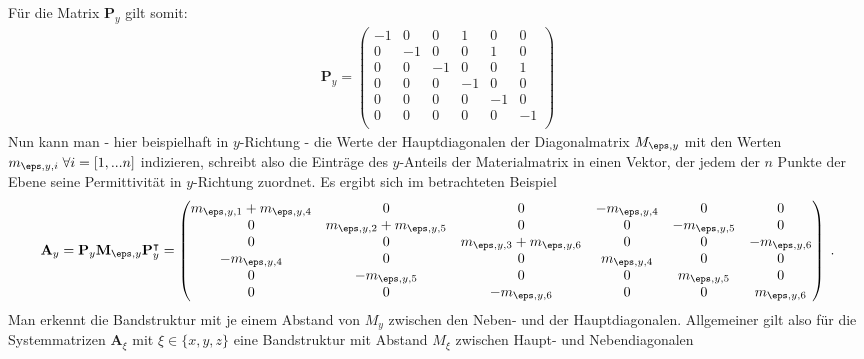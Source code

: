 \documentclass[./Protokollheft.tex]{subfiles}
\begin{document}
Für die Matrix $\mathbf{P}_y$ gilt somit:
\begin{align}
\mathbf{P}_y =  
\begin{pmatrix} 
   -1	& 0 	& 0	& 1		& 0 	& 0		\\
	0  	& -1	& 0	& 0		& 1		& 0		\\
   	0	& 0		&-1	& 0		& 0		& 1		\\ 
    0	& 0		& 0	& -1	& 0		& 0		\\ 
	0	& 0		& 0	& 0		& -1 	& 0		\\
	0	& 0		& 0	& 0		& 0 	& -1	\\
\end{pmatrix} 
\end{align}
Nun kann man - hier beispielhaft in $y$-Richtung - die Werte der Hauptdiagonalen der Diagonalmatrix $M_{\eps , y}$ mit den Werten $m_{\eps, y, i} \; \forall i = [1, ... n]$ indizieren, schreibt also die Einträge des $y$-Anteils der Materialmatrix in einen Vektor, der jedem der $n$ Punkte der Ebene seine Permittivität in $y$-Richtung zuordnet. Es ergibt sich im betrachteten Beispiel
\begin{align}
\mathbf{A}_y =  \mathbf{P}_y \mathbf{M}_{\eps,y} \mathbf{P}_y^\intercal = 
\begin{pmatrix} 
    m_{\eps, y, 1}+m_{\eps, y, 4}	& 0 	 				& 0						& -m_{\eps, y, 4}		& 0				& 0				\\
	0  	 				& m_{\eps, y, 2}+m_{\eps, y, 5}	& 0						& 0					& -m_{\eps, y, 5}	& 0				\\
   	0				 	& 0						& m_{\eps, y, 3}+m_{\eps, y, 6}	& 0					& 0				& -m_{\eps, y, 6}	\\
    -m_{\eps, y, 4}	 		& 0						& 0						& m_{\eps, y, 4}			& 0				& 0				\\ 
	0					& -m_{\eps, y, 5}			& 0						& 0					& m_{\eps, y, 5}		& 0				\\
	0					& 0						& -m_{\eps, y, 6}			& 0					& 0				& m_{\eps, y, 6}		\\
    \end{pmatrix}
    \; .
\end{align}
Man erkennt die Bandstruktur mit je einem Abstand von $M_y$ zwischen den Neben- und der Hauptdiagonalen. 
Allgemeiner gilt also für die Systemmatrizen $\mathbf{A}_{\xi}$ mit $\xi \in \{ x,y,z \}$ eine Bandstruktur mit Abstand $M_{\xi}$ zwischen Haupt- und Nebendiagonalen
\end{document}
